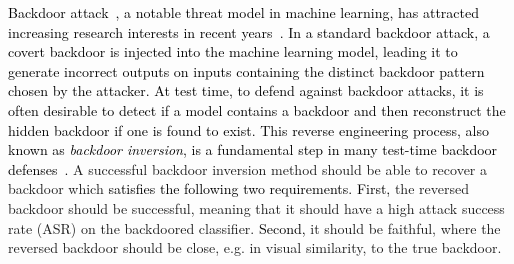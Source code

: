 \documentclass[10pt,twocolumn,letterpaper]{article}
\newcommand{\ms}[1]{\textcolor{black}{#1}}
\begin{document}
\ms{Backdoor attack~\cite{poison_svm,chen2017targeted,goldwasser2022backdoor}, a notable threat model in machine learning, has attracted increasing research interests in recent years~\cite{wild2018biggio,badnet,bagdasaryan2020blind,Qi_2022_CVPR,Qi_2022_CVPR_2,Wenger_2021_CVPR,Doan_2021_ICCV,backdoor_ssl,carlini2022clip,backdoor_nlp,yang2021nlp,Xiang_2021_ICCV}. 
In a standard backdoor attack, a covert backdoor is injected into the machine learning model, leading it to generate incorrect outputs on inputs containing the distinct backdoor pattern chosen by the attacker. 
At test time, to defend against backdoor attacks, it is often desirable to detect if a model contains a backdoor and then  reconstruct the hidden backdoor if one is found to exist. 
This reverse engineering process, also known as \textit{backdoor inversion}, is a fundamental step in many test-time backdoor defenses~\cite{pixelinv,nc2019wang,guo2019tabor,liu2019abs,backdoor_k_arm,qiao2019inspect,hu2022topo,todd2021top}.}
A successful backdoor inversion method should be able to recover a backdoor which \ms{satisfies the following two requirements.} 
\ms{First,} the reversed backdoor should be successful, meaning that it should have a high attack success rate (ASR) on the backdoored classifier. 
\ms{Second,} it should be faithful, where the reversed backdoor should be close, e.g. in visual similarity, to the true backdoor.

\end{document}

